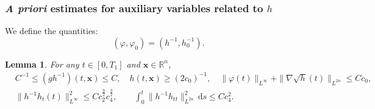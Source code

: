 \documentclass[11pt,reqno]{amsart}
\newtheorem{lem}{Lemma}[section]
\numberwithin{rk}{section}
\numberwithin{prop}{section}
\numberwithin{mydef}{section}
\numberwithin{lem}{section}
\numberwithin{equation}{section}
\numberwithin{thm}{section}
\begin{document}
\subsubsection{\textit{A priori} estimates for auxiliary variables related to $h$}  We define the quantities:
\begin{equation*}
(\varphi,\varphi_0)=(h^{-1},h_0^{-1}).
\end{equation*}
\begin{lem}\label{varphi} 
For any $t\in [0, T_1]$ and $\boldsymbol{x}\in \mathbb{R}^n$, 
\begin{equation*} 
\begin{aligned}
&C^{-1}\leq (gh^{-1})(t,\boldsymbol{x})\leq C,\quad 
h(t,\boldsymbol{x}) \geq (2c_0)^{-1},\quad\|\varphi(t)\|_{L^\infty}+\|\nabla\sqrt{h}(t)\|_{L^{2n}}\leq Cc_0, \\
&\|h^{-1}h_t(t)\|^2_{L^\infty}\leq Cc_2^{\frac{9}{2}}c^{\frac{3}{2}}_4,\qquad \int^t_0\|h^{-1}h_{tt}\|^2_{L^{2n}}\,\mathrm{d}s\leq Cc_4^2.
\end{aligned}
\end{equation*}
\end{lem}
\end{document}
